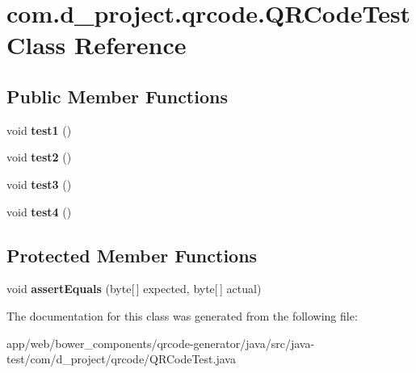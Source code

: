 \hypertarget{classcom_1_1d__project_1_1qrcode_1_1_q_r_code_test}{}\section{com.\+d\+\_\+project.\+qrcode.\+Q\+R\+Code\+Test Class Reference}
\label{classcom_1_1d__project_1_1qrcode_1_1_q_r_code_test}
\subsection*{Public Member Functions}
\begin{DoxyCompactItemize}
\item 
\mbox{\label{classcom_1_1d__project_1_1qrcode_1_1_q_r_code_test_a7b5145dc72399a58d064c131f760b019}} 
void {\bfseries test1} ()
\item 
\mbox{\label{classcom_1_1d__project_1_1qrcode_1_1_q_r_code_test_aa600c40bbf32010d8aa648889b6e01fc}} 
void {\bfseries test2} ()
\item 
\mbox{\label{classcom_1_1d__project_1_1qrcode_1_1_q_r_code_test_a73d7f72534c789c83ba10125cfbd36cc}} 
void {\bfseries test3} ()
\item 
\mbox{\label{classcom_1_1d__project_1_1qrcode_1_1_q_r_code_test_abf9fdb9fdd3361b260f3f22a775eb3b4}} 
void {\bfseries test4} ()
\end{DoxyCompactItemize}
\subsection*{Protected Member Functions}
\begin{DoxyCompactItemize}
\item 
\mbox{\label{classcom_1_1d__project_1_1qrcode_1_1_q_r_code_test_a67e835175897c2a2efe96a92081174c2}} 
void {\bfseries assert\+Equals} (byte\mbox{[}$\,$\mbox{]} expected, byte\mbox{[}$\,$\mbox{]} actual)
\end{DoxyCompactItemize}


The documentation for this class was generated from the following file\+:\begin{DoxyCompactItemize}
\item 
app/web/bower\+\_\+components/qrcode-\/generator/java/src/java-\/test/com/d\+\_\+project/qrcode/Q\+R\+Code\+Test.\+java\end{DoxyCompactItemize}
